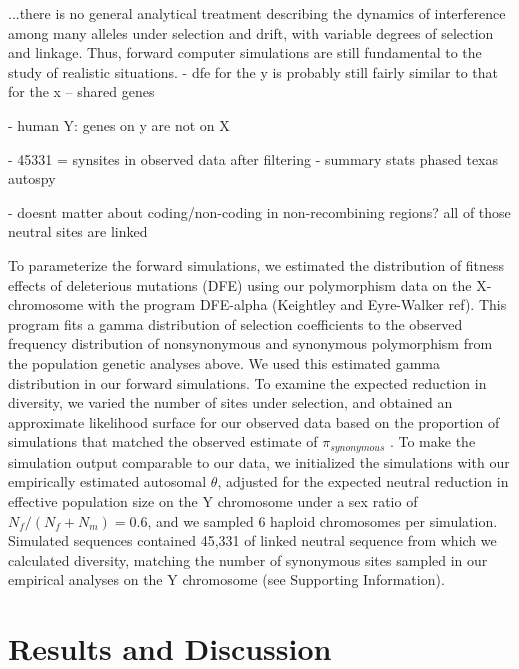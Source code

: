 \documentclass[9pt,twocolumn,twoside]{gsajnl}
\begin{document}
...there is no general analytical treatment describing the dynamics of interference among many alleles under selection and drift, with variable degrees of selection and linkage. Thus, forward computer simulations are still fundamental to the study of realistic situations.
- dfe for the y is probably still fairly similar to that for the x -- shared genes

- human Y: genes on y are not on X

- 45331 = synsites in observed data after filtering
  - summary stats phased texas autospy

- doesnt matter about coding/non-coding in non-recombining regions? all of those neutral sites are linked



To parameterize the forward simulations, we estimated the distribution of fitness effects of deleterious mutations (DFE) using our polymorphism data on the X-chromosome with the program DFE-alpha (\X Keightley and Eyre-Walker ref). This program fits a gamma distribution of selection coefficients to the observed frequency distribution of nonsynonymous and synonymous polymorphism from the population genetic analyses above. We used this estimated gamma distribution in our forward simulations. To examine the expected reduction in diversity, we varied the number of sites under selection, and obtained an approximate likelihood surface for our observed data based on the proportion of simulations that matched the observed estimate of $\pi_{synonymous}$ . To make the simulation output comparable to our data, we initialized the simulations with our empirically estimated autosomal $\theta$, adjusted for the expected neutral reduction in effective population size on the Y chromosome under a sex ratio of $N_{f}/(N_{f}+N_{m})=0.6$, and we sampled 6 haploid chromosomes per simulation. Simulated sequences contained 45,331 of linked neutral sequence from which we calculated diversity, matching the number of synonymous sites sampled in our empirical analyses on the Y chromosome (see Supporting Information).



\section*{Results and Discussion}
\end{document}
